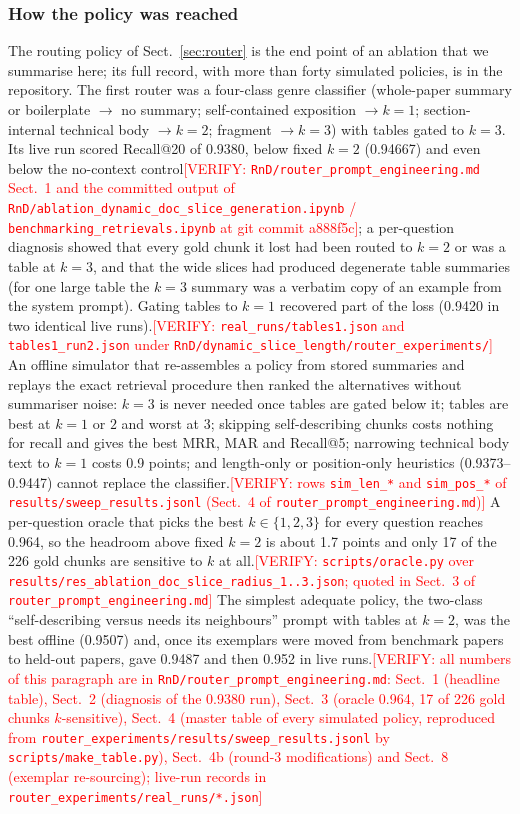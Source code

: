\documentclass[pdflatex,sn-mathphys-num]{sn-jnl}
\makeatletter
\newcommand{\todo}[1]{\textcolor{red}{#1}}
\newcommand{\verify}[1]{\todo{[VERIFY: #1]}}
\newcommand{\Rec}[1]{Recall@#1}
\theoremstyle{thmstyleone}%
\theoremstyle{thmstylethree}%
\makeatother
\begin{document}
\subsubsection{How the policy was reached}
The routing policy of Sect.~\ref{sec:router} is the end point of an ablation that we summarise here; its full record, with more than forty simulated policies, is in the repository. The first router was a four-class genre classifier (whole-paper summary or boilerplate $\to$ no summary; self-contained exposition $\to k=1$; section-internal technical body $\to k=2$; fragment $\to k=3$) with tables gated to $k=3$. Its live run scored \Rec{20} of 0.9380, below fixed $k=2$ (0.94667) and even below the no-context control\verify{\texttt{RnD/router\_prompt\_engineering.md} Sect.~1 and the committed output of \texttt{RnD/ablation\_dynamic\_doc\_slice\_generation.ipynb} / \texttt{benchmarking\_retrievals.ipynb} at git commit a888f5c}; a per-question diagnosis showed that every gold chunk it lost had been routed to $k=2$ or was a table at $k=3$, and that the wide slices had produced degenerate table summaries (for one large table the $k=3$ summary was a verbatim copy of an example from the system prompt). Gating tables to $k=1$ recovered part of the loss (0.9420 in two identical live runs).\verify{\texttt{real\_runs/tables1.json} and \texttt{tables1\_run2.json} under \texttt{RnD/dynamic\_slice\_length/router\_experiments/}} An offline simulator that re-assembles a policy from stored summaries and replays the exact retrieval procedure then ranked the alternatives without summariser noise: $k=3$ is never needed once tables are gated below it; tables are best at $k=1$ or $2$ and worst at $3$; skipping self-describing chunks costs nothing for recall and gives the best MRR, MAR and \Rec{5}; narrowing technical body text to $k=1$ costs 0.9 points; and length-only or position-only heuristics (0.9373--0.9447) cannot replace the classifier.\verify{rows \texttt{sim\_len\_*} and \texttt{sim\_pos\_*} of \texttt{results/sweep\_results.jsonl} (Sect.~4 of \texttt{router\_prompt\_engineering.md})} A per-question oracle that picks the best $k\in\{1,2,3\}$ for every question reaches 0.964, so the headroom above fixed $k=2$ is about 1.7 points and only 17 of the 226 gold chunks are sensitive to $k$ at all.\verify{\texttt{scripts/oracle.py} over \texttt{results/res\_ablation\_doc\_slice\_radius\_1..3.json}; quoted in Sect.~3 of \texttt{router\_prompt\_engineering.md}} The simplest adequate policy, the two-class ``self-describing versus needs its neighbours'' prompt with tables at $k=2$, was the best offline (0.9507) and, once its exemplars were moved from benchmark papers to held-out papers, gave 0.9487 and then 0.952 in live runs.\verify{all numbers of this paragraph are in \texttt{RnD/router\_prompt\_engineering.md}: Sect.~1 (headline table), Sect.~2 (diagnosis of the 0.9380 run), Sect.~3 (oracle 0.964, 17 of 226 gold chunks $k$-sensitive), Sect.~4 (master table of every simulated policy, reproduced from \texttt{router\_experiments/results/sweep\_results.jsonl} by \texttt{scripts/make\_table.py}), Sect.~4b (round-3 modifications) and Sect.~8 (exemplar re-sourcing); live-run records in \texttt{router\_experiments/real\_runs/*.json}}
\end{document}
